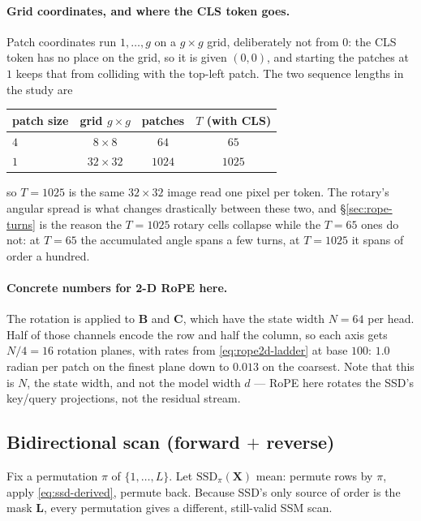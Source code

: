 \documentclass[11pt,a4paper]{article}
\begin{document}
\paragraph{Grid coordinates, and where the CLS token goes.}
Patch coordinates run $1,\dots,g$ on a $g\times g$ grid, deliberately not from
$0$: the CLS token has no place on the grid, so it is given $(0,0)$, and starting
the patches at $1$ keeps that from colliding with the top-left patch. The two
sequence lengths in the study are
\begin{center}
\begin{tabular}{lccc}
\toprule
patch size & grid $g\times g$ & patches & $T$ (with CLS) \\
\midrule
$4$ & $8\times8$   & $64$   & $65$ \\
$1$ & $32\times32$ & $1024$ & $1025$ \\
\bottomrule
\end{tabular}
\end{center}
so $T{=}1025$ is the same $32\times32$ image read one pixel per token. The
rotary's angular spread is what changes drastically between these two, and
\S\ref{sec:rope-turns} is the reason the $T{=}1025$ rotary cells collapse
while the $T{=}65$ ones do not: at $T{=}65$ the accumulated angle spans a few
turns, at $T{=}1025$ it spans of order a hundred.

\paragraph{Concrete numbers for 2-D RoPE here.}
The rotation is applied to $\bm{B}$ and $\bm{C}$, which have the state width
$N=64$ per head. Half of those channels encode the row and half the column, so
each axis gets $N/4=16$ rotation planes, with rates from \eqref{eq:rope2d-ladder}
at base $100$: $1.0$ radian per patch on the finest plane down to $0.013$ on the
coarsest. Note that this is $N$, the state width, and not the model width $d$ ---
RoPE here rotates the SSD's key/query projections, not the residual stream.

\subsection{Bidirectional scan (forward \texorpdfstring{$+$}{+} reverse)}
\label{sec:bidi}

Fix a permutation $\pi$ of $\{1,\dots,L\}$. Let
$\mathrm{SSD}_\pi(\bm{X})$ mean: permute rows by $\pi$, apply
\eqref{eq:ssd-derived}, permute back. Because SSD's only source of
order is the mask $\bm{L}$, every permutation gives a different,
still-valid SSM scan.
\end{document}
